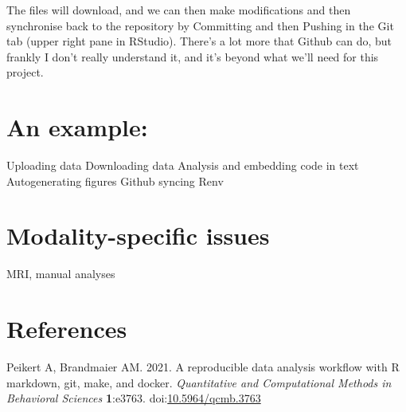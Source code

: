 \documentclass[
]{article}
\newlength{\cslhangindent}
\newlength{\cslentryspacingunit} %
\newenvironment{CSLReferences}[2] %
 {%
  \setlength{\parindent}{0pt}
  \ifodd #1
  \let\oldpar\par
  \def\par{\hangindent=\cslhangindent\oldpar}
  \fi
  \setlength{\parskip}{#2\cslentryspacingunit}
 }%
 {}
\begin{document}
The files will download, and we can then make modifications and then synchronise back to the repository by Committing and then Pushing in the Git tab (upper right pane in RStudio). There's a lot more that Github can do, but frankly I don't really understand it, and it's beyond what we'll need for this project.

\hypertarget{an-example}{%
\section{An example:}\label{an-example}}

Uploading data Downloading data Analysis and embedding code in text Autogenerating figures Github syncing Renv

\hypertarget{modality-specific-issues}{%
\section{Modality-specific issues}\label{modality-specific-issues}}

MRI, manual analyses

\hypertarget{references}{%
\section*{References}\label{references}}

\hypertarget{refs}{}
\begin{CSLReferences}{1}{0}
\leavevmode{}%
Peikert A, Brandmaier AM. 2021. A reproducible data analysis workflow with {R} markdown, git, make, and docker. \emph{Quantitative and Computational Methods in Behavioral Sciences} \textbf{1}:e3763. doi:\href{https://doi.org/10.5964/qcmb.3763}{10.5964/qcmb.3763}

\end{CSLReferences}
\end{document}
